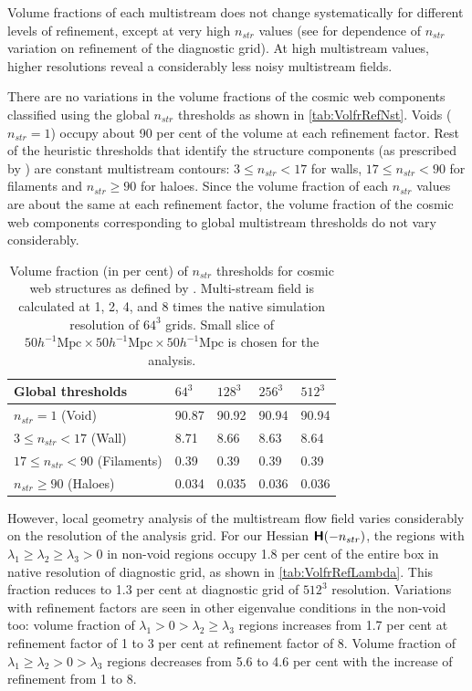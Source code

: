 \documentclass[fleqn,usenatbib,useAMS]{mnras}
\begin{document}
Volume fractions of each multistream does not change systematically for different levels of refinement, except at very high $n_{str}$ values (see \citealt{Ramachandra2015} for dependence of $n_{str}$ variation on refinement of the diagnostic grid). At high multistream values, higher resolutions reveal a considerably less noisy multistream fields. 

There are no variations in the volume fractions of the cosmic web components classified using the global $n_{str}$ thresholds as shown in \autoref{tab:VolfrRefNst}. Voids ($n_{str} = 1$) occupy about 90 per cent of the volume at each refinement factor. Rest of the heuristic thresholds that identify the structure components (as prescribed by \citealt{Ramachandra2015}) are constant multistream contours: $3 \leq n_{str} < 17$ for walls, $17 \leq n_{str} < 90 $ for filaments and $n_{str} \geq 90 $ for haloes. Since the volume fraction of each $n_{str}$ values are about the same at each refinement factor, the volume fraction of the cosmic web components corresponding to global multistream thresholds do not vary considerably. 


\begin{table}
\caption{Volume fraction (in per cent) of $n_{str}$ thresholds for cosmic web structures as defined by \protect\cite{Ramachandra2015}. Multi-stream field is calculated at 1, 2, 4, and 8 times the native simulation resolution of $64^3$ grids. Small slice of $ 50 h^{-1} \text{Mpc} \times 50 h^{-1} \text{Mpc} \times 50 h^{-1} \text{Mpc} $ is chosen for the analysis.}
\begin{tabular}{|l|l|l|l|l}
\hline
Global thresholds  & $64^3$   & $128^3$   & $256^3$  & $512^3$ \\  \hline
$n_{str} = 1$ (Void)     &    90.87   & 90.92  & 90.94 & 90.94 \\ \hline
$3 \leq n_{str} < 17$ (Wall)  & 8.71 & 8.66 & 8.63 & 8.64   \\ \hline
$17 \leq n_{str} < 90 $ (Filaments) &  0.39 & 0.39 & 0.39 & 0.39    \\ \hline
$n_{str} \geq 90 $ (Haloes) & 0.034 & 0.035 & 0.036 & 0.036 \\ \hline

\end{tabular}
\label{tab:VolfrRefNst}
\end{table}



However, local geometry analysis of the multistream flow field varies considerably on the resolution of the analysis grid. For our Hessian $\textbf{\textsf{H}}(-n_{str})$, the regions with $\lambda_1 \geq \lambda_2 \geq \lambda_3 > 0$ in non-void regions occupy 1.8 per cent of the entire box in native resolution of diagnostic grid, as shown in \autoref{tab:VolfrRefLambda}. This fraction reduces to 1.3 per cent at diagnostic grid of $512^3$ resolution. Variations with refinement factors are seen in other eigenvalue conditions in the non-void too: volume fraction of $\lambda_1 > 0 > \lambda_2 \geq \lambda_3 $ regions increases from 1.7 per cent at refinement factor of 1 to 3 per cent at refinement factor of 8. Volume fraction of $\lambda_1 \geq \lambda_2 > 0 > \lambda_3 $ regions decreases from 5.6 to 4.6 per cent with the increase of refinement from 1 to 8. 
\end{document}
